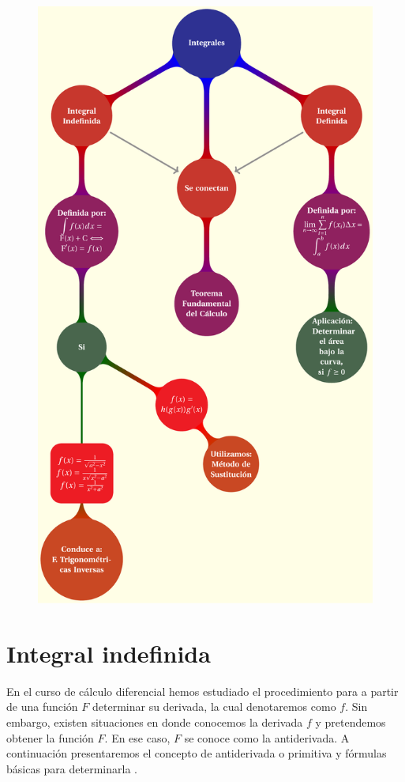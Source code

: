 \begin{figure}[H]
\centering
  \includegraphics[scale=0.5]{pdf/mindmap-integrales-escale} 
 \end{figure}
\newpage
 

\section{Integral indefinida}


En el curso de c\'alculo diferencial hemos estudiado el procedimiento para a partir de una funci\'on $F$ determinar su derivada, la cual denotaremos como $f$. Sin embargo, existen situaciones en donde conocemos la derivada $f$ y pretendemos obtener la funci\'on $F$. En ese caso, $F$ se conoce como la antiderivada. A continuaci\'on presentaremos el concepto de antiderivada o primitiva y f\'ormulas b\'asicas para determinarla . \vspace*{0.3cm}

